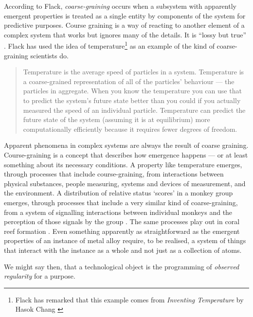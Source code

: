 \documentclass[letterpaper]{article}
\begin{document}
    According to Flack, \emph{coarse-graining} occurs when a subsystem with apparently emergent properties is treated as a single entity by components of the system for predictive purposes. Course graining is a way of reacting to another element of a complex system that works but ignores many of the details. It is “lossy but true” \citep[p.4]{FlackCrsGrnng2017}. Flack has used the idea of temperature\footnote{

        Flack has remarked that this example comes from \emph{Inventing Temperature} by Hasok Chang \citep{ChangInvntngTmprtr2004}

    } as an example of the kind of coarse-graining scientists do.

    \begin{quote}
        Temperature is the average speed of particles in a system. Temperature is a coarse-grained representation of all of the particles' behaviour — the particles in aggregate. When you know the temperature you can use that to predict the system's future state better than you could if you actually measured the speed of an individual particle. Temperature can predict the future state of the system (assuming it is at equilibrium) more computationally efficiently because it requires fewer degrees of freedom. \citep[p.4]{FlackCrsGrnng2017}
    \end{quote}

    Apparent phenomena in complex systems are always the result of coarse graining. Course-graining is a concept that describes how emergence happens — or at least something about its necessary conditions. A property like temperature emerges, through processes that include course-graining, from interactions between physical substances, people measuring, systems and devices of measurement, and the environment. A distribution of relative status ‘scores’ in a monkey group emerges, through processes that include a very similar kind of coarse-graining, from a system of signalling interactions between individual monkeys and the perception of those signals by the group \citep{FlackCntxtMdltsSgnlMnng2007}. The same processes play out in coral reef formation \citep[p.61]{FlackEtAlTmsclsSymmtryUncrtnty2013}. Even something apparently as straightforward as the emergent properties of an instance of metal alloy require, to be realised, a system of things that interact with the instance as a whole and not just as a collection of atoms.

    We might say then, that a technological object is the programming of \emph{observed regularity} for a purpose.
\end{document}

